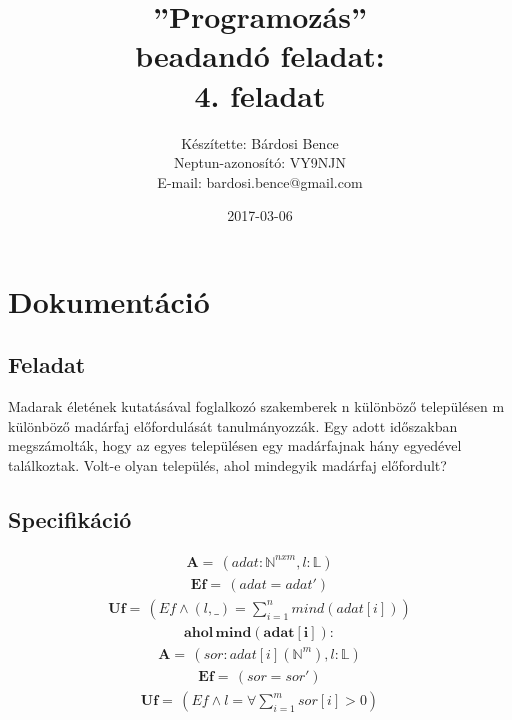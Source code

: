 \documentclass[a4paper]{article}
\title{”Programozás”\\ beadandó feladat:\\ 4. feladat}
\date{2017-03-06}
\author{Készítette: Bárdosi Bence\\ Neptun-azonosító: VY9NJN\\ E-mail: bardosi.bence@gmail.com}
\begin{document}
  \maketitle
  \newpage

  \tableofcontents
  \newpage

  \section{Dokumentáció}
    \subsection{Feladat}
    Madarak életének kutatásával foglalkozó szakemberek n különböző településen m különböző madárfaj előfordulását tanulmányozzák. Egy adott időszakban megszámolták, hogy az egyes településen egy madárfajnak hány egyedével találkoztak.
    Volt-e olyan település, ahol mindegyik madárfaj előfordult?
    \subsection{Specifikáció}
    \begin{align*}
      \mathbf{A=}\, \left ( adat: \mathbb{N}^{n x m} , l: \mathbb{L} \right )
    \end{align*}
    \begin{align*}
      \mathbf{Ef=}\, \left ( adat=adat' \right )
    \end{align*}
    \begin{align*}
      \mathbf{Uf=}\, \left ( Ef \wedge (l,\_)=\sum_{i=1}^n mind(adat[i]) \right )
    \end{align*}
    \begin{align*}
      \mathbf{ahol\, mind(adat[i]):}
    \end{align*}
    \begin{align*}
      \mathbf{A=}\, \left ( sor: adat[i] (\mathbb{N}^{m}) , l: \mathbb{L} \right )
    \end{align*}
    \begin{align*}
      \mathbf{Ef=}\, \left ( sor=sor' \right )
    \end{align*}
    \begin{align*}
      \mathbf{Uf=}\, \left ( Ef \wedge l=\forall \sum_{i=1}^m sor[i]>0 \right )
    \end{align*}
\end{document}
